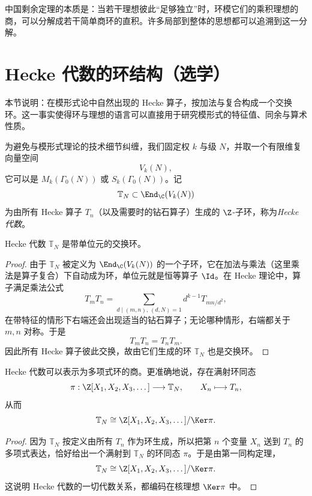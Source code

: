 \begin{remark}
中国剩余定理的本质是：当若干理想彼此“足够独立”时，环模它们的乘积理想的商，可以分解成若干简单商环的直积。许多局部到整体的思想都可以追溯到这一分解。
\end{remark}

\section{Hecke 代数的环结构（选学）}

本节说明：在模形式论中自然出现的 Hecke 算子，按加法与复合构成一个交换环。这一事实使得环与理想的语言可以直接用于研究模形式的特征值、同余与算术性质。

为避免与模形式理论的技术细节纠缠，我们固定权 $k$ 与级 $N$，并取一个有限维复向量空间
\[
V_k(N),
\]
它可以是 $M_k(\Gamma_0(N))$ 或 $S_k(\Gamma_0(N))$。记
\[
\mathbb{T}_N\subset \End_{\C}(V_k(N))
\]
为由所有 Hecke 算子 $T_n$（以及需要时的钻石算子）生成的 $\Z$-子环，称为\emph{Hecke 代数}。

\begin{proposition}
Hecke 代数 $\mathbb{T}_N$ 是带单位元的交换环。
\end{proposition}

\begin{proof}
由于 $\mathbb{T}_N$ 被定义为 $\End_{\C}(V_k(N))$ 的一个子环，它在加法与乘法（这里乘法是算子复合）下自动成为环，单位元就是恒等算子 $\Id$。在 Hecke 理论中，算子满足乘法公式
\[
T_mT_n=\sum_{d\mid (m,n),\,(d,N)=1} d^{k-1}T_{mn/d^2},
\]
在带特征的情形下右端还会出现适当的钻石算子；无论哪种情形，右端都关于 $m,n$ 对称。于是
\[
T_mT_n=T_nT_m.
\]
因此所有 Hecke 算子彼此交换，故由它们生成的环 $\mathbb{T}_N$ 也是交换环。
\end{proof}

\begin{proposition}
Hecke 代数可以表示为多项式环的商。更准确地说，存在满射环同态
\[
\pi:\Z[X_1,X_2,X_3,\dots]\longrightarrow \mathbb{T}_N,
\qquad X_n\longmapsto T_n,
\]
从而
\[
\mathbb{T}_N\cong \Z[X_1,X_2,X_3,\dots]/\Ker\pi.
\]
\end{proposition}

\begin{proof}
因为 $\mathbb{T}_N$ 按定义由所有 $T_n$ 作为环生成，所以把第 $n$ 个变量 $X_n$ 送到 $T_n$ 的多项式表达，恰好给出一个满射到 $\mathbb{T}_N$ 的环同态 $\pi$。于是由第一同构定理，
\[
\mathbb{T}_N\cong \Z[X_1,X_2,X_3,\dots]/\Ker\pi.
\]
这说明 Hecke 代数的一切代数关系，都编码在核理想 $\Ker\pi$ 中。
\end{proof}

